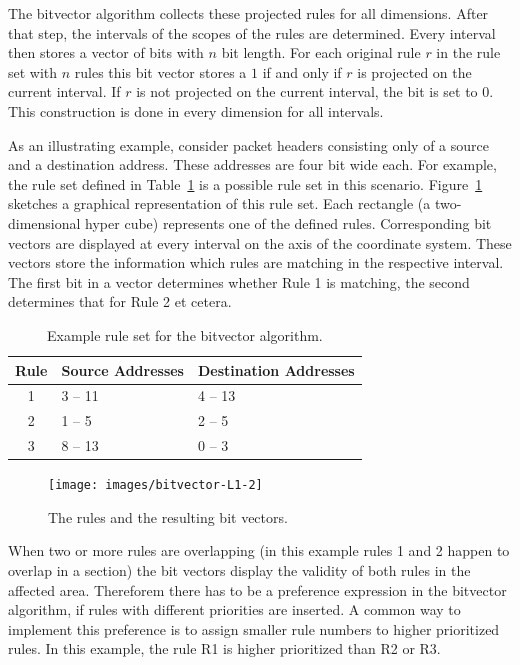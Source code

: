 \documentclass[a4paper,
		12pt,
		parskip=full,
		titlepage
		]{scrartcl}
\begin{document}
The bitvector algorithm collects these projected rules for all dimensions.
After that step, the intervals of the scopes of the rules are determined.
Every interval then stores a vector of bits with $n$ bit length.
For each original rule $r$ in the rule set with $n$ rules this bit vector 
stores a $1$ if and only if $r$ is projected on the current interval.
If $r$ is not projected on the current interval, the bit is set to $0$.
This construction is done in every dimension for all intervals.

As an illustrating example, consider packet headers consisting only of a source and a destination address.
These addresses are four bit wide each.
For example, the rule set defined in Table~\ref{table:bv_ruleset} is a possible rule set in this scenario.
Figure~\ref{fig:bv-normal} sketches a graphical representation of this rule set.
Each rectangle (a two-dimensional hyper cube) represents one of the defined rules.
Corresponding bit vectors are displayed at every interval on the axis of the coordinate system.
These vectors store the information which rules are matching in the respective interval.
The first bit in a vector determines whether Rule 1 is matching, the second determines that for Rule 2 et cetera.

\begin{table}
  \centering
  \begin{tabularx}{0.7\textwidth}{c|X|X}
  Rule&Source Addresses&Destination Addresses\\
  \hline
  1&3 -- 11&4 -- 13\\
  2&1 -- 5&2 -- 5\\
  3&8 -- 13&0 -- 3\\
  \end{tabularx}
  \caption{Example rule set for the bitvector algorithm.}
  \label{table:bv_ruleset}
\end{table}

\begin{figure}
\centering
\texttt{[image: images/bitvector-L1-2]}
\caption{The rules and the resulting bit vectors.}
\label{fig:bv-normal}
\end{figure}

When two or more rules are overlapping (in this example rules 1 and 2 happen 
to overlap in a section) the bit vectors display the validity of both rules in the affected area.
Thereforem there has to be a preference expression in the bitvector algorithm, 
if rules with different priorities are inserted.
A common way to implement this preference is to assign smaller rule numbers to higher prioritized rules.
In this example, the rule R1 is higher prioritized than R2 or R3.
\end{document}
